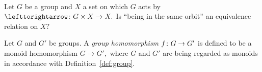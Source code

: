\documentclass[../main/CT4S-EN-RU]{subfiles}
\begin{document}
\begin{exerciseRUS}~
\end{exerciseRUS}

\begin{exerciseENG}
Let $G$ be a group and $X$ a set on which $G$ acts by $\acts\taking G\times X\to X.$ Is “being in the same orbit” an equivalence relation on $X?$ 
\end{exerciseENG}

\begin{exerciseRUS}
\end{exerciseRUS}

\begin{definitionENG}\label{def:group homomorphism}
Let $G$ and $G'$ be groups. A {\em group homomorphism} $f\colon G\rightarrow G'$ is defined to be a monoid homomorphism $G\to G',$ where $G$ and $G'$ are being regarded as monoids in accordance with Definition~\ref{def:group}.
\end{definitionENG}

\begin{definitionRUS}\label{def:group homomorphism}
\end{definitionRUS}
\end{document}
